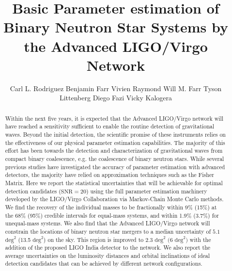\documentclass[11pt,a4paper]{emulateapj} 
\newcommand{\will}[1]{{\color{cyan} #1}}
\begin{document}
\title{Basic Parameter estimation of Binary Neutron Star Systems by
  the Advanced LIGO/Virgo Network} \author{Carl L. Rodriguez
Benjamin Farr 
Vivien Raymond  Will M. Farr 
Tyson Littenberg
Diego Fazi
Vicky Kalogera}

 



\begin{abstract}

Within the next five years, it is expected that the Advanced LIGO/Virgo network will have
reached a sensitivity sufficient to enable the routine detection of
gravitational waves.  Beyond the initial detection, the scientific
promise of these instruments relies on the effectiveness of our physical
parameter estimation capabilities. The majority of this effort has been towards the
detection and characterization of gravitational waves from compact
binary coalescence, e.g. the coalescence of binary neutron stars.
While several previous studies have investigated the accuracy of parameter
estimation with advanced detectors, the majority have relied
on approximation techniques such as the Fisher Matrix.  Here we report the
statistical uncertainties that will be achievable for optimal detection candidates
 ($\text{SNR}=20$) using
the full parameter estimation machinery developed by the LIGO/Virgo
Collaboration via Markov-Chain Monte Carlo methods. 
 We find the recovery of the individual masses to be
fractionally within 9\% (15\%) at the 68\% (95\%) credible intervals for equal-mass
systems, and within 1.9\% (3.7\%) for unequal-mass systems.  We also find that the Advanced
LIGO/Virgo network will constrain the locations of binary neutron star mergers to a median
 uncertainty of $5.1$ $\mathrm{deg}^2$ (13.5 $\mathrm{deg}^2$) on the sky.  This region is improved to  2.3 $\mathrm{deg}^2$ $(6$ $\mathrm{deg}^2)$ with the addition of the proposed LIGO India detector to the network.  We also report the
average uncertainties on the luminosity distances and
orbital inclinations of ideal detection candidates that can be
achieved by different network configurations.
\end{abstract}
\end{document}
